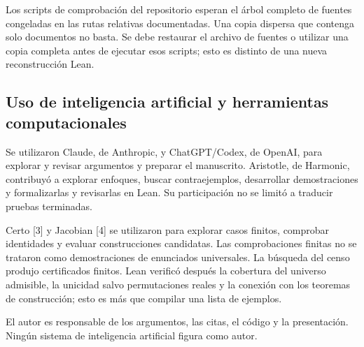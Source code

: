 \documentclass[spanish,11pt,a4paper]{article}
\begin{document}
Los scripts de comprobación del repositorio esperan el árbol completo de fuentes congeladas en las rutas relativas documentadas. Una copia dispersa que contenga solo documentos no basta. Se debe restaurar el archivo de fuentes o utilizar una copia completa antes de ejecutar esos scripts; esto es distinto de una nueva reconstrucción Lean.

\subsection{Uso de inteligencia artificial y herramientas computacionales}\label{uso-de-inteligencia-artificial-y-herramientas-computacionales}

Se utilizaron Claude, de Anthropic, y ChatGPT/Codex, de OpenAI, para explorar y revisar argumentos y preparar el manuscrito. Aristotle, de Harmonic, contribuyó a explorar enfoques, buscar contraejemplos, desarrollar demostraciones y formalizarlas y revisarlas en Lean. Su participación no se limitó a traducir pruebas terminadas.

Certo {[}3{]} y Jacobian {[}4{]} se utilizaron para explorar casos finitos, comprobar identidades y evaluar construcciones candidatas. Las comprobaciones finitas no se trataron como demostraciones de enunciados universales. La búsqueda del censo produjo certificados finitos. Lean verificó después la cobertura del universo admisible, la unicidad salvo permutaciones reales y la conexión con los teoremas de construcción; esto es más que compilar una lista de ejemplos.

El autor es responsable de los argumentos, las citas, el código y la presentación. Ningún sistema de inteligencia artificial figura como autor.
\end{document}
